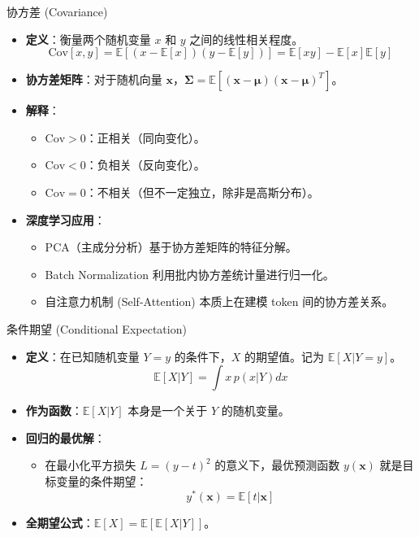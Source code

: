 \documentclass[12pt, aspectratio=169]{beamer}
\newcommand{\vect}[1]{\mathbf{#1}}
\newcommand{\E}{\mathbb{E}}
\begin{document}
\begin{frame}{协方差 (Covariance)}
    \begin{itemize}
        \item \textbf{定义}：衡量两个随机变量 $x$ 和 $y$ 之间的线性相关程度。
        $$ \text{Cov}[x, y] = \E[(x - \E[x])(y - \E[y])] = \E[xy] - \E[x]\E[y] $$
        \item \textbf{协方差矩阵}：对于随机向量 $\vect{x}$，$\boldsymbol{\Sigma} = \E[(\vect{x}-\boldsymbol{\mu})(\vect{x}-\boldsymbol{\mu})^T]$。
        \item \textbf{解释}：
        \begin{itemize}
            \item $\text{Cov} > 0$：正相关（同向变化）。
            \item $\text{Cov} < 0$：负相关（反向变化）。
            \item $\text{Cov} = 0$：不相关（但不一定独立，除非是高斯分布）。
        \end{itemize}
        \item \textbf{深度学习应用}：
        \begin{itemize}
            \item PCA（主成分分析）基于协方差矩阵的特征分解。
            \item Batch Normalization 利用批内协方差统计量进行归一化。
            \item 自注意力机制 (Self-Attention) 本质上在建模 token 间的协方差关系。
        \end{itemize}
    \end{itemize}
\end{frame}

\begin{frame}{条件期望 (Conditional Expectation)}
    \begin{itemize}
        \item \textbf{定义}：在已知随机变量 $Y=y$ 的条件下，$X$ 的期望值。记为 $\E[X|Y=y]$。
        $$ \E[X|Y] = \int x \, p(x|Y) dx $$
        \item \textbf{作为函数}：$\E[X|Y]$ 本身是一个关于 $Y$ 的随机变量。
        \item \textbf{回归的最优解}：
        \begin{itemize}
            \item 在最小化平方损失 $L = (y - t)^2$ 的意义下，最优预测函数 $y(\vect{x})$ 就是目标变量的条件期望：
            $$ y^*(\vect{x}) = \E[t|\vect{x}] $$
        \end{itemize}
        \item \textbf{全期望公式}：$\E[X] = \E[\E[X|Y]]$。
    \end{itemize}
\end{frame}
\end{document}

